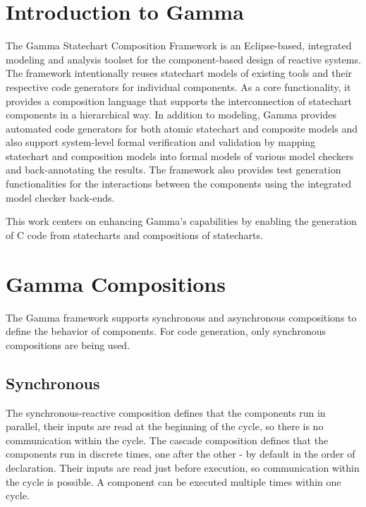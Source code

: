 \newpage

\section{Introduction to Gamma}

The Gamma Statechart Composition Framework\cite{Gamma} is an Eclipse-based, integrated modeling and analysis toolset for the component-based design of reactive systems. The framework intentionally reuses statechart models of existing tools and their respective code generators for individual components. As a core functionality, it provides a composition language that supports the interconnection of statechart components in a hierarchical way. In addition to modeling, Gamma provides automated code generators for both atomic statechart and composite models and also support system-level formal verification and validation by mapping statechart and composition models into formal models of various model checkers and back-annotating the results. The framework also provides test generation functionalities for the interactions between the components using the integrated model checker back-ends. \cite{CPS}

This work centers on enhancing Gamma's capabilities by enabling the generation of C code from statecharts and compositions of statecharts.

\section{Gamma Compositions}

The Gamma framework supports synchronous and asynchronous compositions to define the behavior of components. For code generation, only synchronous compositions are being used.

\subsection{Synchronous}

The synchronous-reactive composition defines that the components run in parallel, their inputs are read at the beginning of the cycle, so there is no communication within the cycle. The cascade composition defines that the components run in discrete times, one after the other - by default in the order of declaration. Their inputs are read just before execution, so communication within the cycle is possible. A component can be executed multiple times within one cycle.

